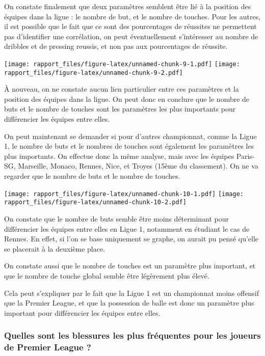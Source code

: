 \documentclass[
]{article}
\begin{document}
On constate finalement que deux paramètres semblent être lié à la
position des équipes dans la ligue : le nombre de but, et le nombre de
touches. Pour les autres, il est possible que le fait que ce sont des
pourcentages de réussites ne permettent pas d'identifier une
corrélation, on peut éventuellement s'intéresser au nombre de dribbles
et de pressing reussis, et non pas aux pourcentages de réussite.

\texttt{[image: rapport\_files/figure-latex/unnamed-chunk-9-1.pdf]}
\texttt{[image: rapport\_files/figure-latex/unnamed-chunk-9-2.pdf]}

À nouveau, on ne constate aucun lien particulier entre ces paramètres et
la position des équipes dans la ligue. On peut donc en conclure que le
nombre de buts et le nombre de touches sont les paramètres les plus
importants pour différencier les équipes entre elles.

On peut maintenant se demander si pour d'autres championnat, comme la
Ligue 1, le nombre de buts et le nombres de touches sont également les
paramètres les plus importants. On effectue donc la même analyse, mais
avec les équipes Paris-SG, Marseille, Monaco, Rennes, Nice, et Troyes
(15ème du classement). On ne va regarder que le nombre de buts et le
nombre de touches.

\texttt{[image: rapport\_files/figure-latex/unnamed-chunk-10-1.pdf]}
\texttt{[image: rapport\_files/figure-latex/unnamed-chunk-10-2.pdf]}

On constate que le nombre de buts semble être moins déterminant pour
différencier les équipes entre elles en Ligue 1, notamment en étudiant
le cas de Rennes. En effet, si l'on se base uniquement se graphe, on
aurait pu pensé qu'elle se placerait à la deuxième place.

On constate aussi que le nombre de touches est un paramètre plus
important, et que le nombre de touche global semble être légèrement plus
élevé.

Cela peut s'expliquer par le fait que la Ligue 1 est un championnat
moins offensif que la Premier League, et que la possession de balle est
donc un paramètre plus important pour différencier les équipes entre
elles.

\hypertarget{quelles-sont-les-blessures-les-plus-fruxe9quentes-pour-les-joueurs-de-premier-league}{%
\subsubsection{\texorpdfstring{\textbf{Quelles sont les blessures les
plus fréquentes pour les joueurs de Premier League
?}}{Quelles sont les blessures les plus fréquentes pour les joueurs de Premier League ?}}\label{quelles-sont-les-blessures-les-plus-fruxe9quentes-pour-les-joueurs-de-premier-league}}
\end{document}
